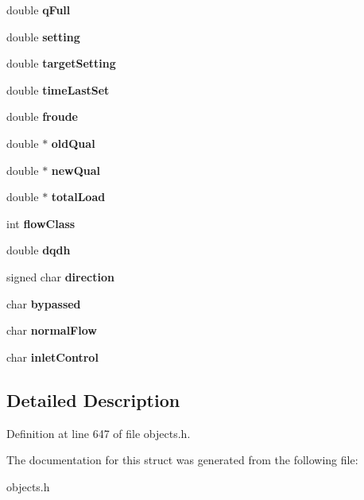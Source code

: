 \begin{DoxyCompactItemize}
double {\bfseries q\+Full}
\item 
\mbox{\label{struct_t_link_a89c19c040edf8540186b127ec7a05981}} 
double {\bfseries setting}
\item 
\mbox{\label{struct_t_link_a37ae507bcb79c2f896b7b8531b123a35}} 
double {\bfseries target\+Setting}
\item 
\mbox{\label{struct_t_link_a41086f946c58add036615be117b7a78b}} 
double {\bfseries time\+Last\+Set}
\item 
\mbox{\label{struct_t_link_abb99aeebe26fc0161639e69d5540b505}} 
double {\bfseries froude}
\item 
\mbox{\label{struct_t_link_a2021ab3e0d06d6461e9a6c734c476edd}} 
double $\ast$ {\bfseries old\+Qual}
\item 
\mbox{\label{struct_t_link_ab4755cc5f84d582feddddc026135b667}} 
double $\ast$ {\bfseries new\+Qual}
\item 
\mbox{\label{struct_t_link_ae3d8bf0ee03b205afb121782c4664ba8}} 
double $\ast$ {\bfseries total\+Load}
\item 
\mbox{\label{struct_t_link_a86f144ae2bef8c08452aa2e684044f8b}} 
int {\bfseries flow\+Class}
\item 
\mbox{\label{struct_t_link_a14f3578bcb0f4ae09f159d174ed8786c}} 
double {\bfseries dqdh}
\item 
\mbox{\label{struct_t_link_a0aee2fde8bc65142ca8be3494d3b832e}} 
signed char {\bfseries direction}
\item 
\mbox{\label{struct_t_link_a565d250af61a033ebe211cf1da1e2f44}} 
char {\bfseries bypassed}
\item 
\mbox{\label{struct_t_link_aa5a5a5b48a014514b0d22adb9cc6090d}} 
char {\bfseries normal\+Flow}
\item 
\mbox{\label{struct_t_link_a310158802ad2aeed1c2a7caabfdb49af}} 
char {\bfseries inlet\+Control}
\end{DoxyCompactItemize}


\subsection{Detailed Description}


Definition at line 647 of file objects.\+h.



The documentation for this struct was generated from the following file\+:\begin{DoxyCompactItemize}
\item 
objects.\+h\end{DoxyCompactItemize}
